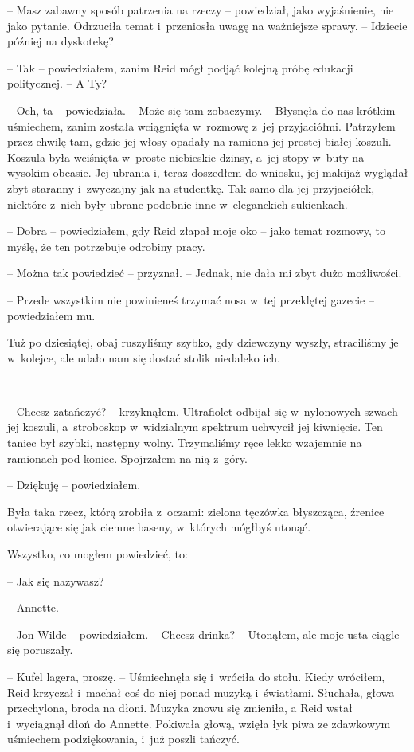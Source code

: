 \documentclass[oneside,polish,11pt,sfheadings]{mwbk}
\begin{document}
-- Masz zabawny sposób patrzenia na rzeczy -- powiedział, jako
wyjaśnienie, nie jako pytanie. Odrzuciła temat i~przeniosła uwagę na
ważniejsze sprawy. -- Idziecie później na dyskotekę?

-- Tak -- powiedziałem, zanim Reid mógł podjąć kolejną próbę edukacji
politycznej. -- A Ty?

-- Och, ta -- powiedziała. -- Może się tam zobaczymy. -- Błysnęła do nas
krótkim uśmiechem, zanim została wciągnięta w~rozmowę z~jej
przyjaciółmi. Patrzyłem przez chwilę tam, gdzie jej włosy opadały na
ramiona jej prostej białej koszuli. Koszula była wciśnięta w~proste
niebieskie dżinsy, a~jej stopy w~buty na wysokim obcasie. Jej ubrania i,
teraz doszedłem do wniosku, jej makijaż wyglądał zbyt staranny i~zwyczajny jak na studentkę. Tak samo dla jej przyjaciółek, niektóre z~nich były ubrane podobnie inne w~eleganckich sukienkach.

-- Dobra -- powiedziałem, gdy Reid złapał moje oko -- jako temat rozmowy,
to myślę, że ten potrzebuje odrobiny pracy.

-- Można tak powiedzieć -- przyznał. -- Jednak, nie dała mi zbyt dużo
możliwości.

-- Przede wszystkim nie powinieneś trzymać nosa w~tej przeklętej gazecie
-- powiedziałem mu.

Tuż po dziesiątej, obaj ruszyliśmy szybko, gdy dziewczyny wyszły,
straciliśmy je w~kolejce, ale udało nam się dostać stolik niedaleko ich.

~

-- Chcesz zatańczyć? -- krzyknąłem. Ultrafiolet odbijał się w~nylonowych
szwach jej koszuli, a~stroboskop w~widzialnym spektrum uchwycił jej
kiwnięcie. Ten taniec był szybki, następny wolny. Trzymaliśmy ręce lekko
wzajemnie na ramionach pod koniec. Spojrzałem na nią z~góry. 

-- Dziękuję -- powiedziałem.

Była taka rzecz, którą zrobiła z~oczami: zielona tęczówka błyszcząca,
źrenice otwierające się jak ciemne baseny, w~których mógłbyś utonąć.

Wszystko, co mogłem powiedzieć, to: 

-- Jak się nazywasz?

-- Annette.

-- Jon Wilde -- powiedziałem. -- Chcesz drinka? -- Utonąłem, ale moje usta
ciągle się poruszały.

-- Kufel lagera, proszę. -- Uśmiechnęła się i~wróciła do stołu. Kiedy
wróciłem, Reid krzyczał i~machał coś do niej ponad muzyką i~światłami.
Słuchała, głowa przechylona, broda na dłoni. Muzyka znowu się zmieniła,
a Reid wstał i~wyciągnął dłoń do Annette. Pokiwała głową, wzięła łyk
piwa ze zdawkowym uśmiechem podziękowania, i~już poszli tańczyć.
\end{document}
